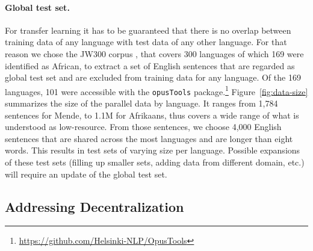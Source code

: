 \documentclass{article} %
\begin{document}
\paragraph{Global test set.} For transfer learning it has to be guaranteed that there is no overlap between training data of any language with test data of any other language. For that reason we chose the JW300 corpus \citep{agic-vulic-2019-jw300}, that covers 300 languages of which 169 were identified as African, to extract a set of English sentences that are regarded as global test set and are excluded from training data for any language. Of the 169 languages, 101 were accessible with the \texttt{opusTools} package.\footnote{\url{https://github.com/Helsinki-NLP/OpusTools}} Figure~\ref{fig:data-size} summarizes the size of the parallel data by language. It ranges from 1,784 sentences for Mende, to 1.1M for Afrikaans, thus covers a wide range of what is understood as low-resource. From those sentences, we choose 4,000 English sentences that are shared across the most languages and are longer than eight words. 
This results in test sets of varying size per language. Possible expansions of these test sets (filling up smaller sets, adding data from different domain, etc.) will require an update of the global test set.


\subsection{Addressing Decentralization}
\label{subsec:decentralization}

\end{document}
